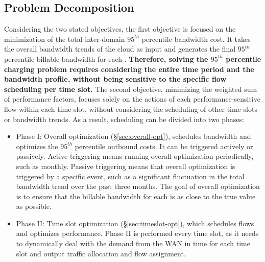 


\subsection{Problem Decomposition}
Considering the two stated objectives, the first objective is focused on the minimization of the total inter-domain $95^{th}$ percentile bandwidth cost. It takes the overall bandwidth trends of the cloud as input and generates the final $95^{th}$ percentile billable bandwidth for each {\egress}. \textbf{Therefore, solving the $95^{th}$ percentile charging problem requires considering the entire time period and the bandwidth profile, without being sensitive to the specific flow scheduling per time slot.} The second objective, minimizing the weighted sum of performance factors, focuses solely on the actions of each performance-sensitive flow within each time slot, without considering the scheduling of other time slots or bandwidth trends. As a result, scheduling can be divided into two phases:



\begin{itemize}
\item
Phase I: Overall optimization (\S{\ref{sec:overall-opt}}), schedules bandwidth and optimizes the $95^{th}$ percentile outbound costs. It can be triggered actively or passively. Active triggering means running overall optimization periodically, such as monthly. Passive triggering means that overall optimization is triggered by a specific event, such as a significant fluctuation in the total bandwidth trend over the past three months. The goal of overall optimization is to ensure that the billable bandwidth for each {\egress} is as close to the true value as possible.

\item 
Phase II: Time slot optimization (\S{\ref{sec:timeslot-opt}}), which schedules flows and optimizes performance. Phase II is performed every time slot, as it needs to dynamically deal with the demand from the WAN in time for each time slot and output traffic allocation and flow assignment.

\end{itemize}

